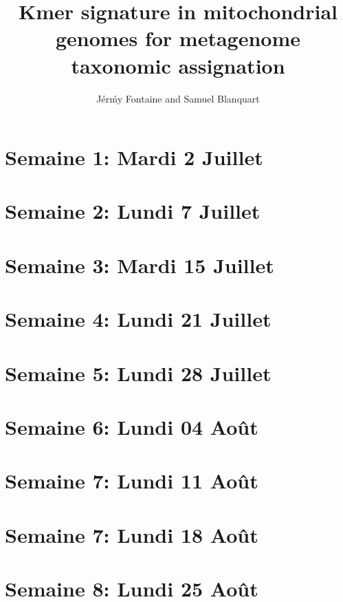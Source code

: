 \documentclass[10pt,a4paper]{article}
\title{Kmer signature in mitochondrial genomes for metagenome taxonomic assignation}
\author{J\'er\'my Fontaine and Samuel Blanquart}
\begin{document}
\maketitle

\section{Semaine 1: Mardi 2 Juillet}


\newpage
\section{Semaine 2: Lundi 7 Juillet}


\newpage
\section{Semaine 3: Mardi 15 Juillet}


\newpage
\section{Semaine 4: Lundi 21 Juillet}


\newpage
\section{Semaine 5: Lundi 28 Juillet}


\newpage
\section{Semaine 6: Lundi 04 Août}


\newpage
\section{Semaine 7: Lundi 11 Août}


\newpage
\section{Semaine 7: Lundi 18 Août}


\newpage
\section{Semaine 8: Lundi 25 Août}

\end{document}
